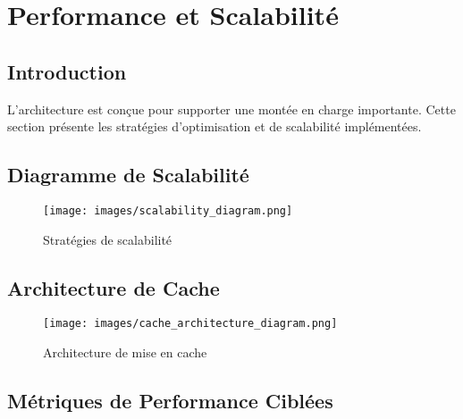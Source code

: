 \section{Performance et Scalabilité}

\subsection{Introduction}

L'architecture est conçue pour supporter une montée en charge importante. Cette section présente les stratégies d'optimisation et de scalabilité implémentées.

\subsection{Diagramme de Scalabilité}

\begin{figure}[H]
    \centering
    \texttt{[image: images/scalability\_diagram.png]}
    \caption{Stratégies de scalabilité}
    \label{fig:scalability}
\end{figure}

\subsection{Architecture de Cache}

\begin{figure}[H]
    \centering
    \texttt{[image: images/cache\_architecture\_diagram.png]}
    \caption{Architecture de mise en cache}
    \label{fig:cache_architecture}
\end{figure}

\subsection{Métriques de Performance Ciblées}

